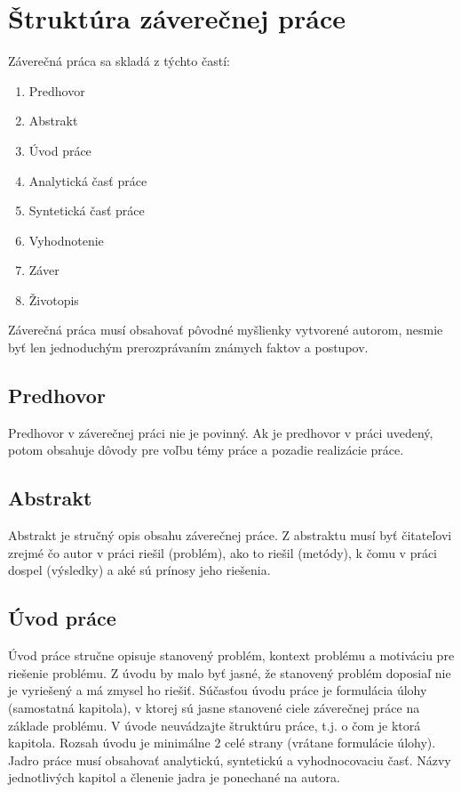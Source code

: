 \section{Štruktúra záverečnej práce}

Záverečná práca sa skladá z týchto častí:

\begin{enumerate}
    \item Predhovor
    \item Abstrakt
    \item Úvod práce
    \item Analytická časť práce
    \item Syntetická časť práce
    \item Vyhodnotenie
    \item Záver
    \item Životopis
\end{enumerate}

Záverečná práca musí obsahovať pôvodné myšlienky vytvorené autorom, nesmie byť len jednoduchým prerozprávaním známych faktov a postupov.

\subsection{Predhovor}

Predhovor v záverečnej práci nie je povinný. Ak je predhovor v práci uvedený, potom obsahuje dôvody pre
voľbu témy práce a pozadie realizácie práce.

\subsection{Abstrakt}

Abstrakt je stručný opis obsahu záverečnej práce. Z abstraktu musí byť čitateľovi zrejmé čo autor v práci
riešil (problém), ako to riešil (metódy), k čomu v práci dospel (výsledky) a aké sú prínosy jeho riešenia.

\subsection{Úvod práce}

Úvod práce stručne opisuje stanovený problém, kontext problému a motiváciu pre riešenie problému. Z úvodu by malo byť jasné, že stanovený problém doposiaľ nie je vyriešený a má zmysel ho riešiť. Súčasťou úvodu práce je formulácia úlohy (samostatná kapitola), v ktorej sú jasne stanovené ciele záverečnej práce na základe problému. V úvode neuvádzajte štruktúru práce, t.j. o čom je ktorá kapitola. Rozsah úvodu je minimálne 2 celé strany (vrátane formulácie úlohy). Jadro práce musí obsahovať analytickú, syntetickú a vyhodnocovaciu časť. Názvy jednotlivých kapitol a členenie jadra je ponechané na autora.
    
